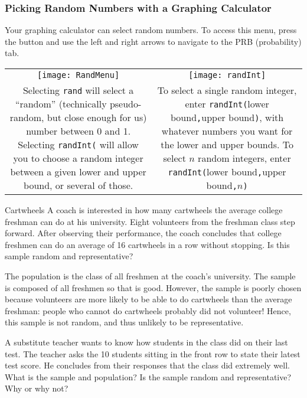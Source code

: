 \subsubsection*{Picking Random Numbers with a Graphing Calculator}
Your graphing calculator can select random numbers.  To access this menu, press the  button and use the left and right arrows to navigate to the PRB (probability) tab.
\begin{center}
\begin{tabular}{c | c}
\texttt{[image: RandMenu]}
& \texttt{[image: randInt]}\\
\parbox{0.45\textwidth}{Selecting \texttt{rand} will select a ``random'' (technically pseudo-random, but close enough for us) number between 0 and 1.  Selecting \texttt{randInt(} will allow you to choose a random integer between a given lower and upper bound, or several of those.}
& \parbox{0.45\textwidth}{To select a single random integer, enter \texttt{randInt(}lower bound\texttt{,}upper bound\texttt{)}, with whatever numbers you want for the lower and upper bounds.  To select $n$ random integers, enter \texttt{randInt(}lower bound\texttt{,}upper bound\texttt{,}$n$\texttt{)}}
\end{tabular}
\end{center}

\begin{example}[https://www.youtube.com/watch?v=mm1iQfMgNHE]{Cartwheels}
A coach is interested in how many cartwheels the average college freshman can do at his university. Eight volunteers from the freshman class step forward. After observing their
performance, the coach concludes that college freshmen can do an average of 16 cartwheels in a row without stopping. Is this sample random and representative?

\sol
The population is the class of all freshmen at the coach's university. The sample is composed of all freshmen so that is good. However, the sample is poorly chosen because volunteers are more likely to be able to do cartwheels than the average freshman: people who cannot do cartwheels probably did not volunteer! Hence, this sample is not random, and thus unlikely to be representative.
\end{example}

\begin{try}
A substitute teacher wants to know how students in the class did on their last test. The teacher asks the 10 students sitting in the front row to state their latest test score. He concludes from their responses that the class did extremely well. What is the sample and population? Is the sample random and representative? Why or why not?
\end{try}

